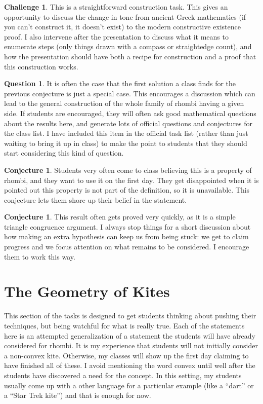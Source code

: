 \documentclass{tufte-handout}
\theoremstyle{definition}
\newtheorem{conjecture}[problem]{Conjecture}
\newtheorem{question}[problem]{Question}
\newtheorem{challenge}[problem]{Challenge}
\begin{document}
\begin{challenge}
This is a straightforward construction task.
This gives an opportunity to discuss the change in tone from ancient Greek mathematics (if you can't construct it, it doesn't exist) to the modern constructive existence proof.
I also intervene after the presentation to discuss what it means to enumerate steps (only things drawn with a compass or straightedge count), and how the presentation should have both a recipe for construction and a proof that this construction works.
\end{challenge}

\begin{question}
It is often the case that the first solution a class finds for the previous conjecture is just a special case.
This encourages a discussion which can lead to the general construction of the whole family of rhombi having a given side.
If students are encouraged, they will often ask good mathematical questions about the results here, and generate lots of official questions and conjectures for the class list. I have included this item in the official task list (rather than just waiting to bring it up in class) to make the point to students that they should start considering this kind of question.
\end{question}

\begin{conjecture}
Students very often come to class believing this is a property of rhombi, and they want to use it on the first day.
They get disappointed when it is pointed out this property is not part of the definition, so it is unavailable.
This conjecture lets them shore up their belief in the statement.
\end{conjecture}

\begin{conjecture}
This result often gets proved very quickly, as it is a simple triangle congruence argument. I always stop things for a short discussion about how making an extra hypothesis can keep us from being stuck: we get to claim progress and we focus attention on what remains to be considered. I encourage them to work this way.
\end{conjecture}


\setcounter{section}{2}
\setcounter{problem}{0}
\section{The Geometry of Kites}

This section of the tasks is designed to get students thinking about pushing their techniques, but being watchful for what is really true. Each of the statements here is an attempted generalization of a statement the students will have already considered for rhombi. It is my experience that students will not initially consider a non-convex kite. Otherwise, my classes will show up the first day claiming to have finished all of these. I avoid mentioning the word convex until well after the students have discovered a need for the concept. In this setting, my students usually come up with a other language for a particular example (like a ``dart'' or a ``Star Trek kite'') and that is enough for now.
\end{document}
